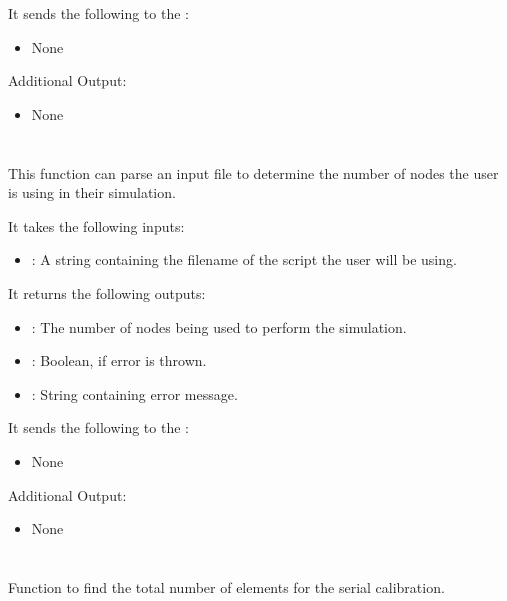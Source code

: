 It sends the following to the :

\begin{itemize}
\item None
\end{itemize}

Additional Output:
\begin{itemize}
\item None
\end{itemize}


\section{}
This function can parse an input  file to determine the number of nodes the user is using in their simulation. 

It takes the following inputs:

\begin{itemize}
\item {}: A string containing the filename of the  script the user will be using.
\end{itemize}

It returns the following outputs:

\begin{itemize}
\item {}: The number of nodes being used to perform the simulation.
\item {}: Boolean,  if error is thrown.
\item {}: String containing error message.
\end{itemize}

It sends the following to the :

\begin{itemize}
\item None
\end{itemize}

Additional Output:
\begin{itemize}
\item None
\end{itemize}


\section{}
Function to find the total number of elements for the serial calibration.

